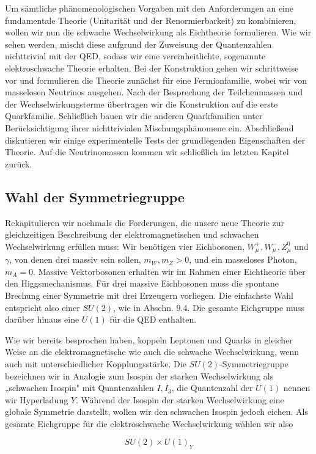 \documentclass[10pt, letterpaper]{article}
\begin{document}
Um sämtliche phänomenologischen Vorgaben mit den Anforderungen an eine fundamentale Theorie (Unitarität und der Renormierbarkeit) zu kombinieren, wollen wir nun die schwache Wechselwirkung als Eichtheorie formulieren. Wie wir sehen werden, mischt diese aufgrund der Zuweisung der Quantenzahlen nichttrivial mit der QED, sodass wir eine vereinheitlichte, sogenannte elektroschwache Theorie erhalten. Bei der Konstruktion gehen wir schrittweise vor und formulieren die Theorie zunächst für eine Fermionfamilie, wobei wir von masselosen Neutrinos ausgehen. Nach der Besprechung der Teilchenmassen und der Wechselwirkungsterme übertragen wir die Konstruktion auf die erste Quarkfamilie. Schließlich bauen wir die anderen Quarkfamilien unter Berücksichtigung ihrer nichttrivialen Mischungsphänomene ein. Abschließend diskutieren wir einige experimentelle Tests der grundlegenden Eigenschaften der Theorie. Auf die Neutrinomassen kommen wir schließlich im letzten Kapitel zurück.

\subsection*{Wahl der Symmetriegruppe}
Rekapitulieren wir nochmals die Forderungen, die unsere neue Theorie zur gleichzeitigen Beschreibung der elektromagnetischen und schwachen Wechselwirkung erfüllen muss: Wir benötigen vier Eichbosonen, $W_{\mu}^{+}, W_{\mu}^{-}, Z_{\mu}^{0}$ und $\gamma$, von denen drei massiv sein sollen, $m_{W}, m_{Z}>0$, und ein masseloses Photon, $m_{A}=0$. Massive Vektorbosonen erhalten wir im Rahmen einer Eichtheorie über den Higgsmechanismus. Für drei massive Eichbosonen muss die spontane Brechung einer Symmetrie mit drei Erzeugern vorliegen. Die einfachste Wahl entspricht also einer $S U(2)$, wie in Abschn. 9.4. Die gesamte Eichgruppe muss darüber hinaus eine $U(1)$ für die QED enthalten.

Wie wir bereits besprochen haben, koppeln Leptonen und Quarks in gleicher Weise an die elektromagnetische wie auch die schwache Wechselwirkung, wenn auch mit unterschiedlicher Kopplungsstärke. Die $S U(2)$-Symmetriegruppe bezeichnen wir in Analogie zum Isospin der starken Wechselwirkung als „schwachen Isospin" mit Quantenzahlen $I, I_{3}$, die Quantenzahl der $U(1)$ nennen wir Hyperladung $Y$. Während der Isospin der starken Wechselwirkung eine globale Symmetrie darstellt, wollen wir den schwachen Isospin jedoch eichen. Als gesamte Eichgruppe für die elektroschwache Wechselwirkung wählen wir also

$$
S U(2) \times U(1)_{Y}
$$
\end{document}
